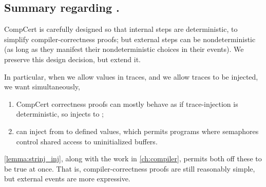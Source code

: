 

\subsection*{Summary regarding .}

CompCert is carefully designed so that internal steps are deterministic, to simplify compiler-correctness proofs; but external steps can be nondeterministic (as long as they manifest their nondeterministic choices in their events).  We preserve this design decision, but extend it.
   
In particular, when we allow  values in traces, and we allow traces to be injected, we want simultaneously,
\begin{enumerate}
\item CompCert correctness proofs can mostly behave as if trace-injection is deterministic, so  injects to ;
\item {} can inject from  to defined values, which permits programs where semaphores control shared access to uninitialized buffers.
\end{enumerate}
\cref{lemma:strinj_inj}, along with the work in \cref{ch:compiler}, permits both off these to be true at once.  That is, compiler-correctness proofs are still reasonably simple, but external events are more expressive.

